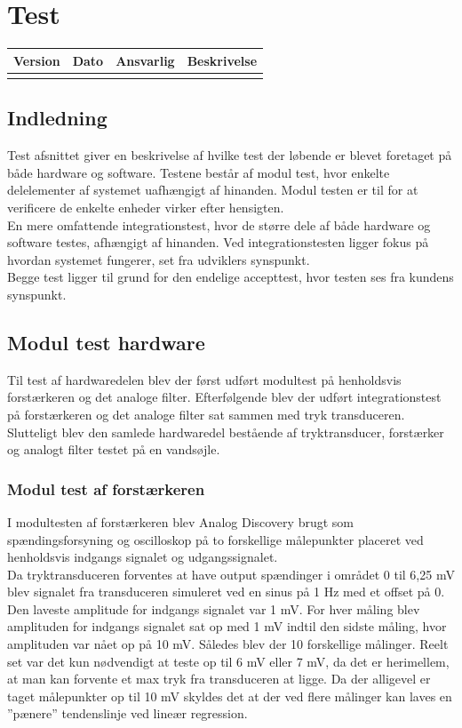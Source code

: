 \chapter{Test}\label{Test}
\setcounter{secnumdepth}{5}

\begin{longtabu} to 
    Version &    Dato &    Ansvarlig &    Beskrivelse\\[-1ex]
    \midrule
\label{version_Systemark}
\end{longtabu}

\section{Indledning} 
Test afsnittet giver en beskrivelse af hvilke test der løbende er blevet foretaget på både hardware og software. Testene består af modul test, hvor enkelte delelementer af systemet uafhængigt af hinanden. Modul testen er til for at verificere de enkelte enheder virker efter hensigten.\\
En mere omfattende integrationstest, hvor de større dele af både hardware og software testes, afhængigt af hinanden. Ved integrationstesten ligger fokus på hvordan systemet fungerer, set fra udviklers synspunkt.\\ Begge test ligger til grund for den endelige accepttest, hvor testen ses fra kundens synspunkt.

\section{Modul test hardware}\label{ModulHard}

Til test af hardwaredelen blev der først udført modultest på henholdsvis forstærkeren og det analoge filter. Efterfølgende blev der udført integrationstest på forstærkeren og det analoge filter sat sammen med tryk transduceren. Slutteligt blev den samlede hardwaredel bestående af tryktransducer, forstærker og analogt filter testet på en vandsøjle.

\subsection{Modul test af forstærkeren}
I modultesten af forstærkeren blev Analog Discovery brugt som spændingsforsyning og oscilloskop på to forskellige målepunkter placeret ved henholdsvis indgangs signalet og udgangssignalet.\\
Da tryktransduceren forventes at have output spændinger i området 0 til 6,25 mV blev signalet fra transduceren simuleret ved en sinus på 1 Hz med et offset på 0. Den laveste amplitude for indgangs signalet var 1 mV. For hver måling blev amplituden for indgangs signalet sat op med 1 mV indtil den sidste måling, hvor amplituden var nået op på 10 mV. Således blev der 10 forskellige målinger. Reelt set var det kun nødvendigt at teste op til 6 mV eller 7 mV, da det er herimellem, at man kan forvente et max tryk fra transduceren at ligge. Da der alligevel er taget målepunkter op til 10 mV skyldes det at der ved flere målinger kan laves en ”pænere” tendenslinje ved lineær regression.

